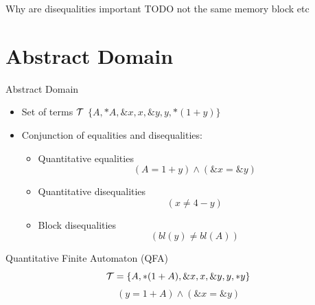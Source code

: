 \documentclass{beamer}
\begin{document}
\begin{frame}{Why are disequalities important}
    TODO
    not the same memory block etc
\end{frame}

\section{Abstract Domain}
\frame{\tableofcontents[currentsection]}

\begin{frame}{Abstract Domain}
    \begin{itemize}
        \item Set of terms $\mathcal{T}$
        $\{A, *A, \&x, x, \&y, y, *(1+y)\}$
        \item Conjunction of equalities and disequalities:
        \begin{itemize}
        \item Quantitative equalities
        \[
         (A = 1 + y) \land (\&x = \&y)
        \]
        \item Quantitative disequalities
        \[
            (x \neq 4 - y)
        \]
        \item Block disequalities
        \[
            (bl(y) \neq bl(A))
        \]
        \end{itemize}
    \end{itemize}
\end{frame}

\begin{frame}{Quantitative Finite Automaton (QFA)}
    \[
            \mathcal{T}=\{A, *(1 + A), \&x, x, \&y, y, *y\}
\]
\[
    (y = 1 + A) \land (\&x = \&y)
\]
\centering
{}
\end{frame}
\end{document}
